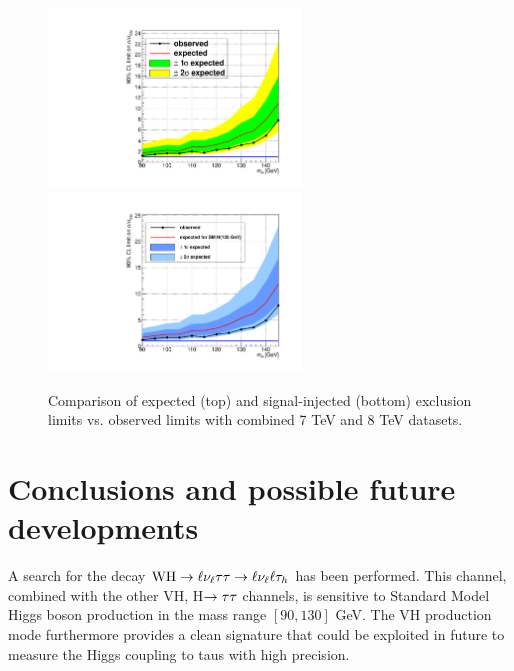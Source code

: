 \begin{figure}
\begin{center}
  \includegraphics[width=0.6\textwidth]{4_Analisys/pics/limits/vhtt_wh/vhtt_wh.pdf}\\
  \includegraphics[width=0.6\textwidth]{4_Analisys/pics/limits/vhtt_wh/vhtt_wh_injected.pdf}
  \caption{Comparison of expected (top) and signal-injected (bottom) exclusion limits vs. observed limits with combined 7 TeV and 8 TeV datasets.}
  \label{fig:llt_limits}
\end{center}
\end{figure}


\chapter{Conclusions and possible future developments}

A search for the decay $\mathrm{W}\mathrm{H}\rightarrow\ell\nu_\ell\tau\tau \rightarrow \ell \nu_\ell \ell \tau_h$ has been performed. This channel, combined with the other VH, H$\rightarrow\tau\tau$ channels, is sensitive to Standard Model Higgs boson production in the mass range $[90, 130]$ GeV. The VH production mode furthermore provides a clean signature that could be exploited in future to measure the Higgs coupling to taus with high precision. 

